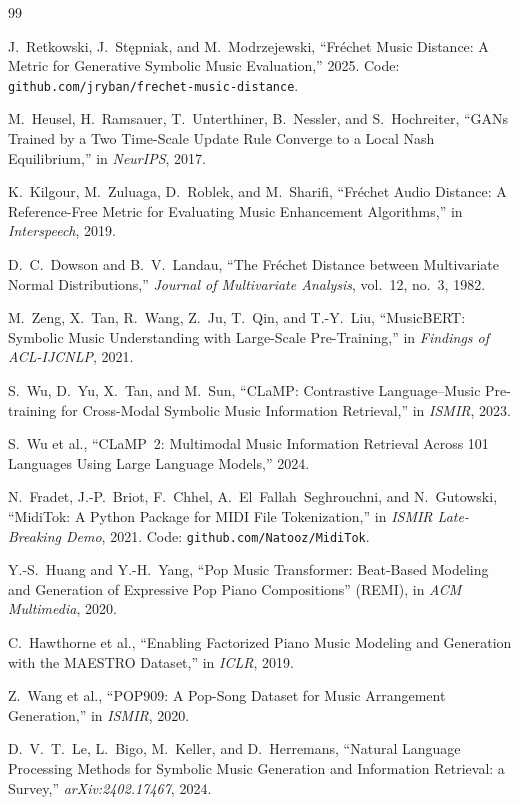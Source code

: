 \documentclass[11pt]{article}
\begin{document}
\begin{thebibliography}{99}
\small

J.~Retkowski, J.~St\k{e}pniak, and M.~Modrzejewski,
``Fr\'echet Music Distance: A Metric for Generative Symbolic Music
Evaluation,'' 2025. Code: \texttt{github.com/jryban/frechet-music-distance}.

M.~Heusel, H.~Ramsauer, T.~Unterthiner, B.~Nessler, and S.~Hochreiter,
``GANs Trained by a Two Time-Scale Update Rule Converge to a Local Nash
Equilibrium,'' in \emph{NeurIPS}, 2017.

K.~Kilgour, M.~Zuluaga, D.~Roblek, and M.~Sharifi,
``Fr\'echet Audio Distance: A Reference-Free Metric for Evaluating Music
Enhancement Algorithms,'' in \emph{Interspeech}, 2019.

D.~C.~Dowson and B.~V.~Landau,
``The Fr\'echet Distance between Multivariate Normal Distributions,''
\emph{Journal of Multivariate Analysis}, vol.~12, no.~3, 1982.

M.~Zeng, X.~Tan, R.~Wang, Z.~Ju, T.~Qin, and T.-Y.~Liu,
``MusicBERT: Symbolic Music Understanding with Large-Scale Pre-Training,''
in \emph{Findings of ACL-IJCNLP}, 2021.

S.~Wu, D.~Yu, X.~Tan, and M.~Sun,
``CLaMP: Contrastive Language--Music Pre-training for Cross-Modal Symbolic
Music Information Retrieval,'' in \emph{ISMIR}, 2023.

S.~Wu et al.,
``CLaMP~2: Multimodal Music Information Retrieval Across 101 Languages Using
Large Language Models,'' 2024.

N.~Fradet, J.-P.~Briot, F.~Chhel, A.~El~Fallah~Seghrouchni, and
N.~Gutowski,
``MidiTok: A Python Package for MIDI File Tokenization,'' in
\emph{ISMIR Late-Breaking Demo}, 2021. Code:
\texttt{github.com/Natooz/MidiTok}.

Y.-S.~Huang and Y.-H.~Yang,
``Pop Music Transformer: Beat-Based Modeling and Generation of Expressive
Pop Piano Compositions'' (REMI), in \emph{ACM Multimedia}, 2020.

C.~Hawthorne et al.,
``Enabling Factorized Piano Music Modeling and Generation with the MAESTRO
Dataset,'' in \emph{ICLR}, 2019.

Z.~Wang et al.,
``POP909: A Pop-Song Dataset for Music Arrangement Generation,'' in
\emph{ISMIR}, 2020.

D.~V.~T.~Le, L.~Bigo, M.~Keller, and D.~Herremans,
``Natural Language Processing Methods for Symbolic Music Generation and
Information Retrieval: a Survey,'' \emph{arXiv:2402.17467}, 2024.

\end{thebibliography}
\end{document}
